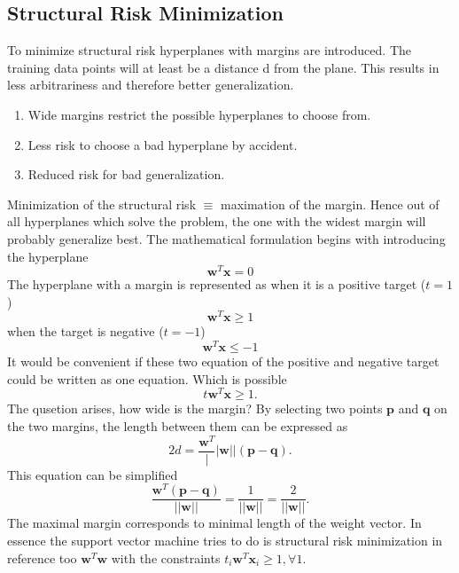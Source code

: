 \documentclass[12pt]{article}
\numberwithin{equation}{section}
\begin{document}
\subsection{Structural Risk Minimization}
To minimize structural risk hyperplanes with margins are introduced. The training data points will at least be a distance d from the plane. This results in less arbitrariness and therefore better generalization.
\begin{enumerate}
    \item Wide margins restrict the possible hyperplanes to choose from.
    \item Less risk to choose a bad  hyperplane by accident.
    \item Reduced risk for bad generalization.
\end{enumerate}
Minimization of the structural risk $\equiv$ maximation of the margin. Hence out of all hyperplanes which solve the problem, the one with the widest margin will probably generalize best. The mathematical formulation begins with introducing the hyperplane
\begin{equation}
    \bm{w}^T\bm{x} = 0
\end{equation}
The hyperplane with a margin is represented as when it is a positive target ($t = 1$)
\begin{equation}
    \bm{w}^T\bm{x} \geq 1
\end{equation}
when the target is negative ($t = -1$)
\begin{equation}
    \bm{w}^T\bm{x} \leq -1
\end{equation}
It would be convenient if these two equation of the positive and negative target could be written as one equation. Which is possible
\begin{equation}
    t \bm{w}^T\bm{x} \geq 1.
\end{equation}
The qusetion arises, how wide is the margin? By selecting two points $\bm{p}$ and $\bm{q}$ on the two margins, the length between them can be expressed as 
\begin{equation}
    2d = \frac{\bm{w}^T}||{\bm{w}||} (\bm{p}-\bm{q}).
\end{equation}
This equation can be simplified
\begin{equation}
    \frac{\bm{w}^T(\bm{p}-\bm{q})}{||\bm{w}||} = \frac{1}{||\bm{w}||} = \frac{2}{||\bm{w}||}.
\end{equation}
The maximal margin corresponds to minimal length of the weight vector. In essence the support vector machine tries to do is structural risk minimization in reference too $\bm{w}^T\bm{w}$ with the constraints $t_i \bm{w}^T \bm{x}_i \geq 1, \forall 1$.
\end{document}
